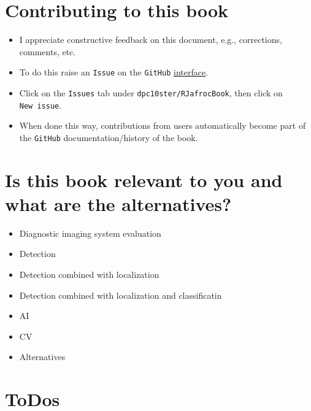 \documentclass[
]{book}
\providecommand{\tightlist}{%
  \setlength{\itemsep}{0pt}\setlength{\parskip}{0pt}}
\begin{document}
\hypertarget{contributing-to-this-book}{%
\section*{Contributing to this book}\label{contributing-to-this-book}}

\begin{itemize}
\tightlist
\item
  I appreciate constructive feedback on this document, e.g., corrections, comments, etc.\\
\item
  To do this raise an \texttt{Issue} on the \texttt{GitHub} \href{https://github.com/dpc10ster/RJafrocBook}{interface}.
\item
  Click on the \texttt{Issues} tab under \texttt{dpc10ster/RJafrocBook}, then click on \texttt{New\ issue}.
\item
  When done this way, contributions from users automatically become part of the \texttt{GitHub} documentation/history of the book.
\end{itemize}

\hypertarget{is-this-book-relevant-to-you-and-what-are-the-alternatives}{%
\section*{Is this book relevant to you and what are the alternatives?}\label{is-this-book-relevant-to-you-and-what-are-the-alternatives}}

\begin{itemize}
\tightlist
\item
  Diagnostic imaging system evaluation
\item
  Detection
\item
  Detection combined with localization
\item
  Detection combined with localization and classificatin
\item
  AI
\item
  CV
\item
  Alternatives
\end{itemize}

\hypertarget{todos}{%
\section*{ToDos}\label{todos}}
\end{document}
